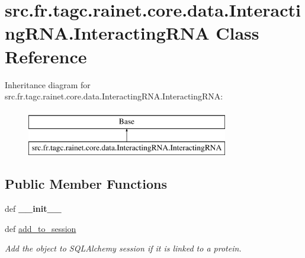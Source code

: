 \hypertarget{classsrc_1_1fr_1_1tagc_1_1rainet_1_1core_1_1data_1_1InteractingRNA_1_1InteractingRNA}{\section{src.\-fr.\-tagc.\-rainet.\-core.\-data.\-Interacting\-R\-N\-A.\-Interacting\-R\-N\-A Class Reference}
\label{classsrc_1_1fr_1_1tagc_1_1rainet_1_1core_1_1data_1_1InteractingRNA_1_1InteractingRNA}
}
Inheritance diagram for src.\-fr.\-tagc.\-rainet.\-core.\-data.\-Interacting\-R\-N\-A.\-Interacting\-R\-N\-A\-:\begin{figure}[H]
\begin{center}
\leavevmode
\includegraphics[height=2.000000cm]{classsrc_1_1fr_1_1tagc_1_1rainet_1_1core_1_1data_1_1InteractingRNA_1_1InteractingRNA}
\end{center}
\end{figure}
\subsection*{Public Member Functions}
\begin{DoxyCompactItemize}
\item 
\hypertarget{classsrc_1_1fr_1_1tagc_1_1rainet_1_1core_1_1data_1_1InteractingRNA_1_1InteractingRNA_a086d9a23e2d560554a345a53bae0b18f}{def {\bfseries \-\_\-\-\_\-init\-\_\-\-\_\-}}\label{classsrc_1_1fr_1_1tagc_1_1rainet_1_1core_1_1data_1_1InteractingRNA_1_1InteractingRNA_a086d9a23e2d560554a345a53bae0b18f}

\item 
\hypertarget{classsrc_1_1fr_1_1tagc_1_1rainet_1_1core_1_1data_1_1InteractingRNA_1_1InteractingRNA_a9d14d77bb37ed9fd7f72746eedc57528}{def \hyperlink{classsrc_1_1fr_1_1tagc_1_1rainet_1_1core_1_1data_1_1InteractingRNA_1_1InteractingRNA_a9d14d77bb37ed9fd7f72746eedc57528}{add\-\_\-to\-\_\-session}}\label{classsrc_1_1fr_1_1tagc_1_1rainet_1_1core_1_1data_1_1InteractingRNA_1_1InteractingRNA_a9d14d77bb37ed9fd7f72746eedc57528}

\begin{DoxyCompactList}\small\item\em Add the object to S\-Q\-L\-Alchemy session if it is linked to a protein. \end{DoxyCompactList}\end{DoxyCompactItemize}
